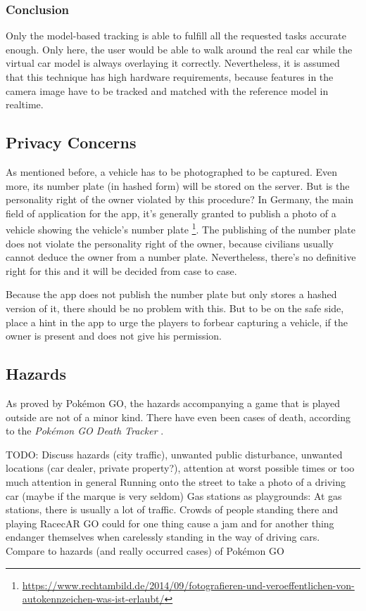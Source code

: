 \subsubsection{Conclusion}
Only the model-based tracking is able to fulfill all the requested tasks accurate enough. Only here, the user would be able to walk around the real car while the virtual car model is always overlaying it correctly. Nevertheless, it is assumed that this technique has high hardware requirements, because features in the camera image have to be tracked and matched with the reference model in realtime.

\subsection{Privacy Concerns}
As mentioned before, a vehicle has to be photographed to be captured. Even more, its number plate (in hashed form) will be stored on the server. But is the personality right of the owner violated by this procedure? In Germany, the main field of application for the app, it's generally granted to publish a photo of a vehicle showing the vehicle's number plate \footnote{\url{https://www.rechtambild.de/2014/09/fotografieren-und-veroeffentlichen-von-autokennzeichen-was-ist-erlaubt/}}. The publishing of the number plate does not violate the personality right of the owner, because civilians usually cannot deduce the owner from a number plate. Nevertheless, there's no definitive right for this and it will be decided from case to case.

Because the app does not publish the number plate but only stores a hashed version of it, there should be no problem with this. But to be on the safe side, place a hint in the app to urge the players to forbear capturing a vehicle, if the owner is present and does not give his permission.

\subsection{Hazards}\label{sec:hazards}
As proved by Pok\'{e}mon GO, the hazards accompanying a game that is played outside are not of a minor kind. There have even been cases of death, according to the \emph{Pok\'{e}mon GO Death Tracker} \citep{PokemonGoDeathTracker}.

TODO:
Discuss hazards (city traffic), unwanted public disturbance, unwanted locations (car dealer, private property?), attention at worst possible times or too much attention in general
Running onto the street to take a photo of a driving car (maybe if the marque is very seldom)
Gas stations as playgrounds: At gas stations, there is usually a lot of traffic. Crowds of people standing there and playing RacecAR GO could for one thing cause a jam and for another thing endanger themselves when carelessly standing in the way of driving cars.
Compare to hazards (and really occurred cases) of Pok\'{e}mon GO


